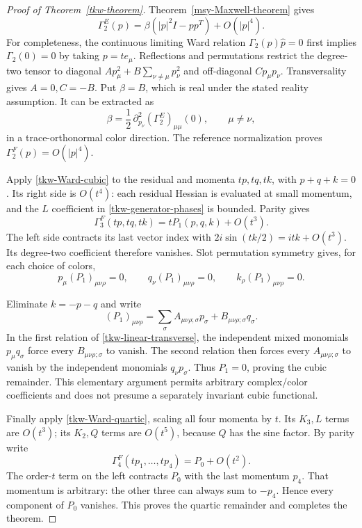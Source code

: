 \begin{proof}[Proof of Theorem~\ref{tkw-theorem}]
Theorem~\ref{msy-Maxwell-theorem} gives
\[
 \Gamma_2^E(p)=\beta(|p|^2I-pp^T)+O(|p|^4).
\]
For completeness, the continuous limiting Ward relation
\(\Gamma_2(p)\widehat p=0\) first implies \(\Gamma_2(0)=0\)
by taking \(p=te_\mu\). Reflections and permutations restrict
the degree-two tensor to diagonal
\(A p_\mu^2+B\sum_{\nu\ne\mu}p_\nu^2\) and off-diagonal
\(C p_\mu p_\nu\). Transversality gives \(A=0,C=-B\).
Put \(\beta=B\), which is real under the stated reality
assumption. It can be extracted as
\begin{equation}
 \beta=\frac12\,
  \partial_{p_\nu}^2(\Gamma_2^E)_{\mu\mu}(0),
       \qquad \mu\ne\nu,
 \label{tkw-beta}
\end{equation}
in a trace-orthonormal color direction. The reference
normalization proves \(\Gamma_2^F(p)=O(|p|^4)\).

Apply \eqref{tkw-Ward-cubic} to the residual and momenta
\(tp,tq,tk\), with \(p+q+k=0\). Its right side is \(O(t^4)\):
each residual Hessian is evaluated at small momentum, and
the \(L\) coefficient in \eqref{tkw-generator-phases} is bounded.
Parity gives
\[
 \Gamma_3^F(tp,tq,tk)=tP_1(p,q,k)+O(t^3).
\]
The left side contracts its last vector index with
\(2i\sin(tk/2)=itk+O(t^3)\). Its degree-two coefficient
therefore vanishes. Slot permutation symmetry gives, for
each choice of colors,
\begin{equation}
 p_\mu(P_1)_{\mu\nu\rho}=0,\qquad
 q_\nu(P_1)_{\mu\nu\rho}=0,\qquad
 k_\rho(P_1)_{\mu\nu\rho}=0.
 \label{tkw-linear-transverse}
\end{equation}

Eliminate \(k=-p-q\) and write
\[
 (P_1)_{\mu\nu\rho}
  =\sum_\sigma A_{\mu\nu\rho;\sigma}p_\sigma
                   +B_{\mu\nu\rho;\sigma}q_\sigma .
\]
In the first relation of \eqref{tkw-linear-transverse},
the independent mixed monomials \(p_\mu q_\sigma\)
force every \(B_{\mu\nu\rho;\sigma}\) to vanish.
The second relation then forces every \(A_{\mu\nu\rho;\sigma}\)
to vanish by the independent monomials \(q_\nu p_\sigma\).
Thus \(P_1=0\), proving the cubic remainder. This elementary
argument permits arbitrary complex/color coefficients and
does not presume a separately invariant cubic functional.

Finally apply \eqref{tkw-Ward-quartic}, scaling all four
momenta by \(t\). Its \(K_3,L\) terms are \(O(t^3)\);
its \(K_2,Q\) terms are \(O(t^5)\), because \(Q\) has
the sine factor. By parity write
\[
 \Gamma_4^F(tp_1,\ldots,tp_4)=P_0+O(t^2).
\]
The order-\(t\) term on the left contracts \(P_0\) with
the last momentum \(p_4\). That momentum is arbitrary:
the other three can always sum to \(-p_4\). Hence
every component of \(P_0\) vanishes. This proves the
quartic remainder and completes the theorem.
\end{proof}

